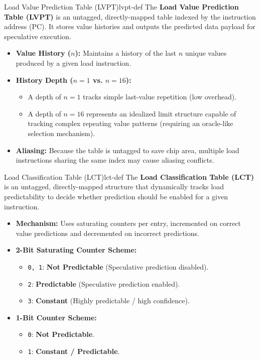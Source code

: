 \begin{definition}{Load Value Prediction Table (LVPT)}{lvpt-def}
The \textbf{Load Value Prediction Table (LVPT)} is an untagged, directly-mapped table indexed by the instruction address (PC). It stores value histories and outputs the predicted data payload for speculative execution.
\begin{itemize}
    \item \textbf{Value History ($n$):} Maintains a history of the last $n$ unique values produced by a given load instruction.
    \item \textbf{History Depth ($n=1$ vs. $n=16$):} 
    \begin{itemize}
        \item A depth of $n=1$ tracks simple last-value repetition (low overhead).
        \item A depth of $n=16$ represents an idealized limit structure capable of tracking complex repeating value patterns (requiring an oracle-like selection mechanism).
    \end{itemize}
    \item \textbf{Aliasing:} Because the table is untagged to save chip area, multiple load instructions sharing the same index may cause aliasing conflicts.
\end{itemize}
\end{definition}

\begin{definition}{Load Classification Table (LCT)}{lct-def}
The \textbf{Load Classification Table (LCT)} is an untagged, directly-mapped structure that dynamically tracks load predictability to decide whether prediction should be enabled for a given instruction.
\begin{itemize}
    \item \textbf{Mechanism:} Uses saturating counters per entry, incremented on correct value predictions and decremented on incorrect predictions.
    \item \textbf{2-Bit Saturating Counter Scheme:}
    \begin{itemize}
        \item \texttt{0, 1}: \textbf{Not Predictable} (Speculative prediction disabled).
        \item \texttt{2}: \textbf{Predictable} (Speculative prediction enabled).
        \item \texttt{3}: \textbf{Constant} (Highly predictable / high confidence).
    \end{itemize}
    \item \textbf{1-Bit Counter Scheme:}
    \begin{itemize}
        \item \texttt{0}: \textbf{Not Predictable}.
        \item \texttt{1}: \textbf{Constant / Predictable}.
    \end{itemize}
\end{itemize}
\end{definition}

